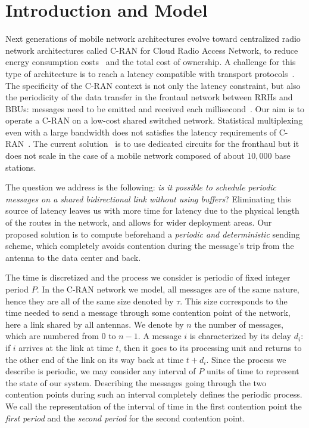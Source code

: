 \documentclass[10pt, conference, letterpaper]{algotel}
\begin{document}
\section{Introduction and Model}

Next generations of mobile network architectures evolve toward centralized radio network architectures called C-RAN for Cloud Radio Access Network, to reduce energy consumption costs~\cite{mobile2011c} and the total cost of ownership. A challenge for this type of architecture is to reach a latency compatible with transport protocols~\cite{ieeep802}. The specificity of the C-RAN context is not only the latency constraint, but also the periodicity of the data transfer in the frontaul network between RRHs and BBUs: messages need to be emitted and received each millisecond~\cite{bouguen2012lte}. Our aim is to operate a C-RAN on a low-cost shared switched network. Statistical multiplexing even with a large bandwidth does not satisfies the latency requirements of C-RAN~\cite{barth2018deterministic}. The current solution~\cite{tayq2017real} is to use dedicated circuits for the fronthaul but it does not scale in the case of a mobile network composed of about $10,000$ base stations. 

The question we address is the following: \emph{is it possible to schedule periodic messages on a shared bidirectional link without using buffers}? Eliminating this source of latency leaves us with more time for latency due to the physical length of the routes in the network, and allows for wider deployment areas. Our proposed solution is to compute beforehand a \emph{periodic and deterministic} sending scheme, which completely avoids contention during the message's trip from the antenna to the data center and back. 

The time is discretized and the process we consider is periodic of fixed integer period $P$. In the C-RAN network we model, all messages are of the same nature, hence they are all of the same size denoted by $\tau$. This size corresponds to the time needed to send a message through some contention point of the network, here a link shared by all antennas. We denote by $n$ the number of messages, which are numbered from $0$ to $n-1$. A message $i$ is characterized by its delay $d_i$: if $i$ arrives at the link at time $t$, then it goes to its processing unit and returns to the other end of the link on its way back at time $t + d_i$. Since the process we describe is periodic, we may consider any interval of $P$ units of time
to represent the state of our system. Describing the messages going through the two contention points during such an interval completely defines the periodic process. We call the representation of the interval of time in the first contention point the \emph{first period} and the \emph{second period} for the second contention point.
\end{document}
